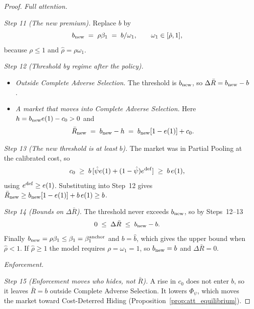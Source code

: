 \begin{proof}
\medskip\noindent\emph{Full attention.}

\emph{Step 11 (The new premium).} Replace $b$ by
\begin{equation*}
    b_{\rm new}\;=\;\rho\beta_1\;=\;b/\omega_1,\qquad \omega_1\in[\hat\rho,1],
\end{equation*}
because $\rho\le1$ and $\hat\rho=\rho\omega_1$.

\emph{Step 12 (Threshold by regime after the policy).}
\begin{itemize}
    \item \emph{Outside Complete Adverse Selection.} The threshold is $b_{\rm new}$, so $\Delta\bar R=b_{\rm new}-b$.
    \item \emph{A market that moves into Complete Adverse Selection.} Here $h=b_{\rm new}e(1)-c_0>0$ and
    \begin{equation*}
        \bar R_{\rm new}\;=\;b_{\rm new}-h\;=\;b_{\rm new}[1-e(1)]+c_0.
    \end{equation*}
\end{itemize}

\emph{Step 13 (The new threshold is at least $b$).} The market was in Partial Pooling at the calibrated cost, so
\begin{equation*}
    c_0\;\ge\;b\,[\hat\psi e(1)+(1-\hat\psi)e^{\rm def}]\;\ge\;b\,e(1),
\end{equation*}
using $e^{\rm def}\ge e(1)$. Substituting into Step~12 gives $\bar R_{\rm new}\ge b_{\rm new}[1-e(1)]+b\,e(1)\ge b$.

\emph{Step 14 (Bounds on $\Delta\bar R$).} The threshold never exceeds $b_{\rm new}$, so by Steps~12--13
\begin{equation*}
    0\;\le\;\Delta\bar R\;\le\;b_{\rm new}-b.
\end{equation*}
Finally $b_{\rm new}=\rho\beta_1\le\beta_1=\beta_1^{\rm anchor}$ and $b=\hat b$, which gives the upper bound when $\hat\rho<1$. If $\hat\rho\ge1$ the model requires $\rho=\omega_1=1$, so $b_{\rm new}=b$ and $\Delta\bar R=0$.

\medskip\noindent\emph{Enforcement.}

\emph{Step 15 (Enforcement moves who hides, not $\bar R$).} A rise in $c_0$ does not enter $b$, so it leaves $\bar R=b$ outside Complete Adverse Selection. It lowers $\Phi_\psi$, which moves the market toward Cost-Deterred Hiding (Proposition~\ref{prop:att_equilibrium}).
\end{proof}

